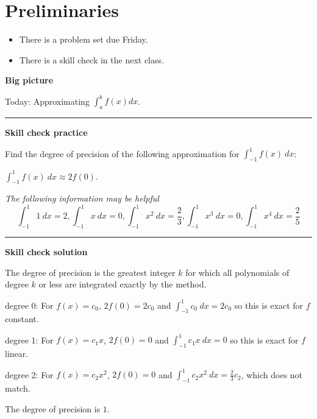 \documentclass[12pt,letterpaper,noanswers]{exam}
\begin{document}
 \pdfpageheight 11in 
  \pdfpagewidth 8.5in

\noindent 

\section*{Preliminaries}

\begin{itemize}
\itemsep0pt
\item There is a problem set due Friday.
\item There is a skill check in the next class.
\end{itemize}


\noindent\textbf{Big picture}

Today: Approximating $\int_{a}^{b}f(x)dx$.

\vspace{0.2cm}
\hrule
\vspace{0.2cm}

\noindent \textbf{Skill check practice}

 Find the degree of precision of the following approximation for $\displaystyle\int_{-1}^1 f(x)\ dx$:

$\displaystyle\int_{-1}^1 f(x)\ dx\approx 2f(0)$.

\emph{The following information may be helpful}
\[\int_{-1}^1 1\ dx = 2, \int_{-1}^1 x\ dx = 0, \int_{-1}^1 x^2\ dx = \frac{2}{3}, \int_{-1}^1 x^3\ dx =0, \int_{-1}^1 x^4\ dx = \frac{2}{5}\]



\vspace{0.2cm}
\hrule
\vspace{0.2cm}

\noindent \textbf{Skill check solution}

The degree of precision is the greatest integer $k$ for which all polynomials of degree $k$ or less are integrated exactly by the method.

degree 0: For $f(x) = c_0$, $2f(0) = 2c_0$ and $\int_{-1}^1 c_0\ dx = 2c_0$  so this is exact for $f$ constant.

degree 1: For $f(x) = c_1 x$, $2f(0) = 0$ and $\int_{-1}^1 c_1 x\ dx = 0$ so this is exact for $f$ linear.

degree 2: For $f(x) = c_2 x^2$, $2f(0) = 0$ and $\int_{-1}^1 c_2 x^2\ dx = \frac{2}{3}c_2$, which does not match.

The degree of precision is $1$.
\end{document}
